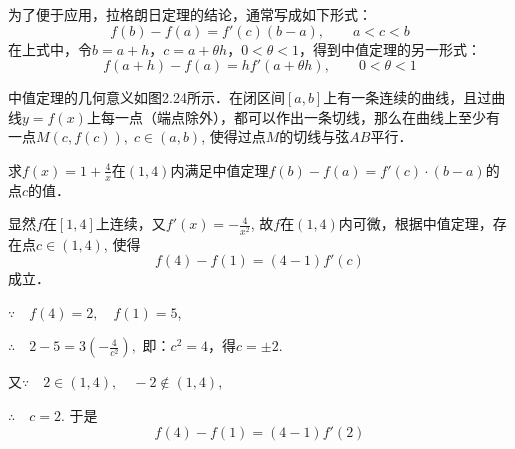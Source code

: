 为了便于应用，拉格朗日定理的结论，通常写成如下形式：
\begin{equation}
   f (b) -f (a) =f' (c) (b-a),\qquad a<c<b \label{eq:mvt1}
\end{equation}
在上式中，令$b=a+h$，$c=a+\theta h$，$0<\theta<1$，得到中值定理的另一形式：
\begin{equation}
    f (a+h) -f (a) =hf' (a+\theta h) ,\qquad 0<\theta<1
\end{equation}

中值定理的几何意义如图2.24所示．在闭区间$[a,b]$上有一条连续的曲线，且过曲线$y=f(x)$上每一点（端点除外），都可以作出一条切线，那么在曲线上至少有一点$M(c, f( c)),\; c\in (a,b)$, 使得过点$M$的切线与弦$AB$平行．

\begin{figure}[htp]
    \centering
{}
    \caption{}
\end{figure}



\begin{example}
求$f(x)=1+\frac{4}{x}$在$(1, 4)$内满足中值定理$f(b)-f(a)=f'(c)\cdot (b-a)$的点$c$的值．
\end{example}


\begin{solution}
    显然$f$在$[1, 4]$上连续，又$f'(x)=-\frac{4}{x^2}$, 故$f$在$(1, 4)$内可微，根据中值定理，存在点$c\in (1, 4)$, 使得
\[    f (4) -f (1) = (4-1) f' (c)\]
成立．

$\because\quad f (4) =2,\quad f (1) =5$,

$\therefore\quad 2-5=3 \left(-\frac{4}{c^2}\right),$
即：$c^2=4$，得$c=\pm 2$.

又$\because\quad 2\in (1, 4),\quad -2\notin (1, 4)$,

$\therefore\quad c=2$. 于是
\[    f (4) -f (1) = (4-1) f' (2) \]
\end{solution}

